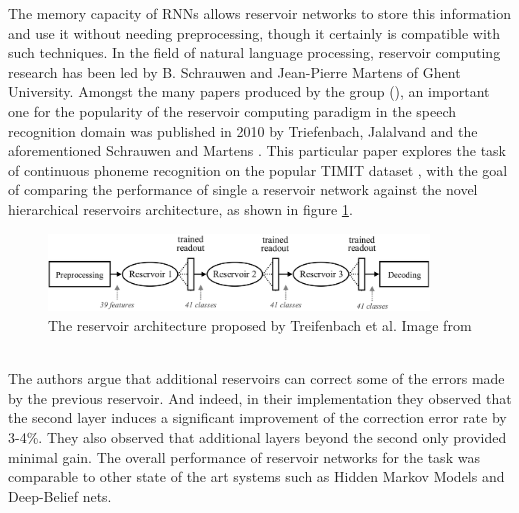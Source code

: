 \documentclass[12pt,oneside]{CUNY_CS_PhD}
\begin{document}
The memory capacity of RNNs allows reservoir networks to store this information and use it without needing preprocessing, though it certainly is compatible with such techniques. In the field of natural language processing, reservoir computing research has been led by B. Schrauwen and Jean-Pierre Martens of Ghent University. Amongst the many papers produced by the group (\cite{verstraeten_isolated_2005, jalalvand_connected_2011}), 
an important one for the popularity of the reservoir computing paradigm in the speech recognition domain was published in 2010 by Triefenbach, Jalalvand and the aforementioned Schrauwen and Martens \cite{triefenbach_phoneme_2010}. This particular paper explores the task of continuous phoneme recognition on the popular TIMIT dataset \cite{timit}, with the goal of comparing the performance of single a reservoir network against the novel hierarchical reservoirs architecture, as shown in figure \ref{fig:layered-res}.
\begin{figure}[!htbp]
\centering
\includegraphics[width=0.9\textwidth]{pictures/layered-res.png}
\caption{The reservoir architecture proposed by Treifenbach et al. Image from \cite{triefenbach_phoneme_2010}}
\label{fig:layered-res}
\end{figure}\\
The authors argue that additional reservoirs can correct some of the errors made by the previous reservoir. And indeed, in their implementation they observed that the second layer induces a significant improvement of the correction error rate by 3-4\%. They also observed that additional layers beyond the second only provided minimal gain. The overall performance of reservoir networks for the task was comparable to other state of the art systems such as Hidden Markov Models and Deep-Belief nets. 
\end{document}
